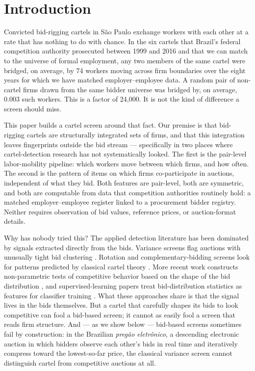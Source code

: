 \section{Introduction}\label{sec:intro}

Convicted bid-rigging cartels in S\~{a}o Paulo exchange workers with each other at a rate that has nothing to do with chance. In the six cartels that Brazil's federal competition authority prosecuted between 1999 and 2016 and that we can match to the universe of formal employment, any two members of the same cartel were bridged, on average, by 74 workers moving across firm boundaries over the eight years for which we have matched employer--employee data. A random pair of non-cartel firms drawn from the same bidder universe was bridged by, on average, $0.003$ such workers. This is a factor of 24{,}000. It is not the kind of difference a screen should miss.

This paper builds a cartel screen around that fact. Our premise is that bid-rigging cartels are structurally integrated sets of firms, and that this integration leaves fingerprints outside the bid stream --- specifically in two places where cartel-detection research has not systematically looked. The first is the pair-level labor-mobility pipeline: which workers move between which firms, and how often. The second is the pattern of items on which firms co-participate in auctions, independent of what they bid. Both features are pair-level, both are symmetric, and both are computable from data that competition authorities routinely hold: a matched employer--employee register linked to a procurement bidder registry. Neither requires observation of bid values, reference prices, or auction-format details.

Why has nobody tried this? The applied detection literature has been dominated by signals extracted directly from the bids. Variance screens flag auctions with unusually tight bid clustering \citep{abrantesmetz2006screening, harrington2008detecting_effects}. Rotation and complementary-bidding screens look for patterns predicted by classical cartel theory \citep{porter1993detection, porter1999detection, bajari2003deciding}. More recent work constructs non-parametric tests of competitive behavior based on the shape of the bid distribution \citep{chassang2022robust, kawai2022detecting}, and supervised-learning papers treat bid-distribution statistics as features for classifier training \citep{huber2019detection, kawai2023bidrotation}. What these approaches share is that the signal lives in the bids themselves. But a cartel that carefully shapes its bids to look competitive can fool a bid-based screen; it cannot as easily fool a screen that reads firm structure. And --- as we show below --- bid-based screens sometimes fail by construction: in the Brazilian \emph{preg\~{a}o eletr\^{o}nico}, a descending electronic auction in which bidders observe each other's bids in real time and iteratively compress toward the lowest-so-far price, the classical variance screen cannot distinguish cartel from competitive auctions at all.

